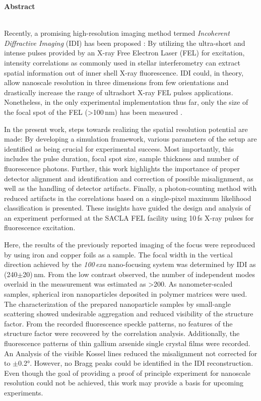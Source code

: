 	\begin{Huge}
		\textbf{Abstract}\vspace{12mm}
	\end{Huge}
\\
Recently, a promising high-resolution imaging method termed \textit{Incoherent Diffractive Imaging} (IDI) has been proposed \cite{classen2017}: By utilizing the ultra-short and intense pulses provided by an X-ray Free Electron Laser (FEL) for excitation,  intensity correlations as commonly used in stellar interferometry can extract spatial information out of inner shell X-ray fluorescence.  
IDI could, in theory, allow nanoscale resolution in three dimensions from few orientations and drastically increase the range of ultrashort X-ray FEL pulses applications. Nonetheless, in the only experimental implementation thus far, only the size of the focal spot of the FEL (>100\,nm) has been measured \cite{nakumura2020}.

In the present work, steps towards realizing the spatial resolution potential are made: By developing a simulation framework, various parameters of the setup are identified as being crucial for experimental success. Most importantly, this includes the pulse duration, focal spot size,  sample thickness and number of fluorescence photons. Further, this work highlights the importance of proper detector alignment and identification and correction of possible misalignment, as well as the handling of detector artifacts. Finally, a photon-counting method with reduced artifacts in the correlations based on a single-pixel maximum likelihood classification is presented. These insights have guided the design and analysis of an experiment performed at the SACLA FEL facility using 10\,fs X-ray pulses for fluorescence excitation.

Here, the results of the previously reported imaging of the focus were reproduced by using iron and copper foils as a sample. The focal width in the vertical direction achieved by the \textit{100\,exa} nano-focusing system was determined by IDI  as (240$\pm$20)\,nm. From the low contrast observed, the number of independent modes overlaid in the measurement was estimated as >200.  As nanometer-scaled samples, spherical iron nanoparticles deposited in polymer matrices were used. The characterization of the prepared nanoparticle samples by small-angle scattering showed undesirable aggregation and reduced visibility of the structure factor.  From the recorded fluorescence speckle patterns, no features of the structure factor were recovered by the correlation analysis.  Additionally, the fluorescence patterns of thin gallium arsenide single crystal films were recorded.  An Analysis of the visible Kossel lines reduced the misalignment not corrected for to $\pm$0.2°. However, no Bragg peaks could be identified in the IDI reconstruction.
Even though the goal of providing a proof of principle experiment for nanoscale resolution could not be achieved, this work may provide a basis for upcoming experiments.





